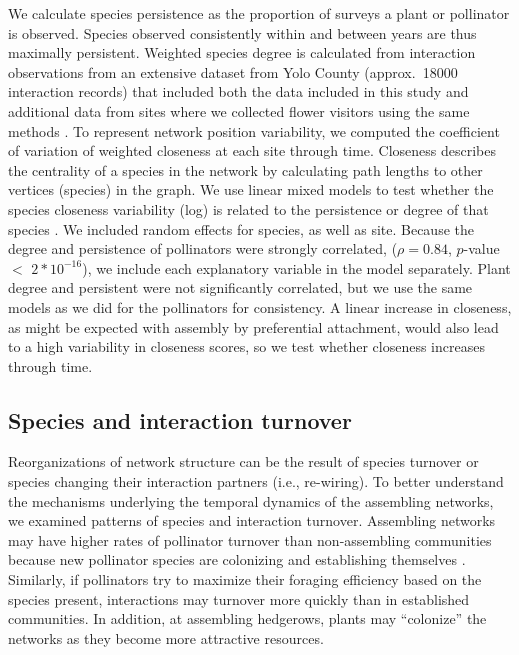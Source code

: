 \documentclass[12pt]{article}
\begin{document}
We calculate species persistence as the proportion of surveys a plant
or pollinator is observed. Species observed consistently within and
between years are thus maximally persistent. Weighted species degree
is calculated from interaction observations from an extensive dataset
from Yolo County (approx.~18000 interaction records) that included
both the data included in this study and additional data from sites
where we collected flower visitors using the same methods
\citep{mgonigle-2015-x, ponisio2015farm}. To represent network
position variability, we computed the coefficient of variation of
weighted closeness at each site through time. Closeness describes the
centrality of a species in the network by calculating path lengths to
other vertices (species) in the graph. We use linear mixed models to
test whether the species closeness variability (log) is related to the
persistence or degree of that species \citep{lme4, lmetest}. We
included random effects for species, as well as site. Because the
degree and persistence of pollinators were strongly correlated, ($\rho
= 0.84$, $p$-value $<$ $2*10^{-16}$), we include each explanatory
variable in the model separately. Plant degree and persistent were not
significantly correlated, but we use the same models as we did for the
pollinators for consistency. A linear increase in closeness, as might
be expected with assembly by preferential attachment, would also lead
to a high variability in closeness scores, so we test whether
closeness increases through time.

\subsection*{Species and interaction turnover}

Reorganizations of network structure can be the result of species
turnover or species changing their interaction partners (i.e.,
re-wiring). To better understand the mechanisms underlying the
temporal dynamics of the assembling networks, we examined patterns of
species and interaction turnover. Assembling networks may have higher
rates of pollinator turnover than non-assembling communities because
new pollinator species are colonizing and establishing themselves
\citep{mgonigle-2015-x}. Similarly, if pollinators try to maximize
their foraging efficiency based on the species present, interactions
may turnover more quickly than in established communities. In
addition, at assembling hedgerows, plants may ``colonize'' the
networks as they become more attractive resources.
\end{document}
